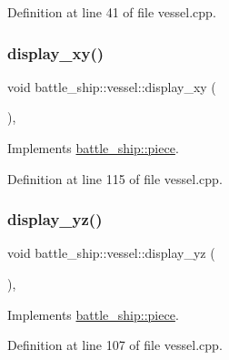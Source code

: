 Definition at line 41 of file vessel.\+cpp.

\mbox{\label{classbattle__ship_1_1vessel_a60924b058d686ebf545ae8f4d9f42d76}} 
\subsubsection{\texorpdfstring{display\+\_\+xy()}{display\_xy()}}
{\footnotesize\ttfamily void battle\+\_\+ship\+::vessel\+::display\+\_\+xy (\begin{DoxyParamCaption}{ }\end{DoxyParamCaption})\hspace{0.3cm}{\ttfamily [override]}, {\ttfamily [virtual]}}



Implements \hyperlink{classbattle__ship_1_1piece_a0f900b13641277ae9e809e4baa5c8c10}{battle\+\_\+ship\+::piece}.



Definition at line 115 of file vessel.\+cpp.

\mbox{\label{classbattle__ship_1_1vessel_aa4f50939cb109b09c6b300313e193198}} 
\subsubsection{\texorpdfstring{display\+\_\+yz()}{display\_yz()}}
{\footnotesize\ttfamily void battle\+\_\+ship\+::vessel\+::display\+\_\+yz (\begin{DoxyParamCaption}{ }\end{DoxyParamCaption})\hspace{0.3cm}{\ttfamily [override]}, {\ttfamily [virtual]}}



Implements \hyperlink{classbattle__ship_1_1piece_ad46ddc76d6e682a4f1fc8965a0c7813c}{battle\+\_\+ship\+::piece}.



Definition at line 107 of file vessel.\+cpp.

\mbox{\label{classbattle__ship_1_1vessel_a398b4134137d9e11c13e6aee548e1802}} 
